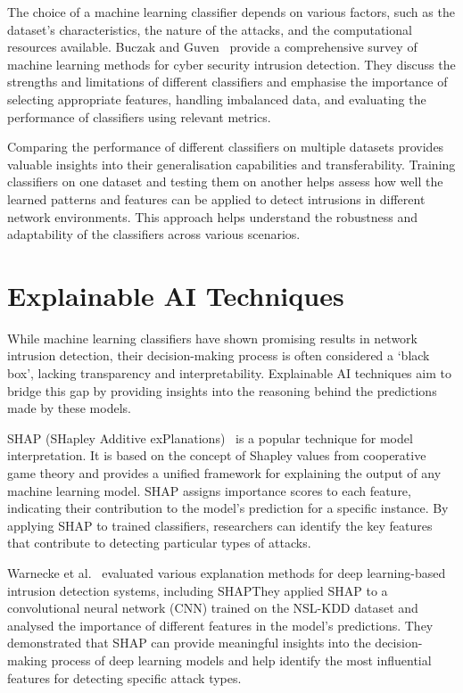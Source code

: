 The choice of a machine learning classifier depends on various factors, such as the dataset's characteristics, the nature of the attacks, and the computational resources available. Buczak and Guven~\cite{buczak2015survey} provide a comprehensive survey of machine learning methods for cyber security intrusion detection. They discuss the strengths and limitations of different classifiers and emphasise the importance of selecting appropriate features, handling imbalanced data, and evaluating the performance of classifiers using relevant metrics.

Comparing the performance of different classifiers on multiple datasets provides valuable insights into their generalisation capabilities and transferability. Training classifiers on one dataset and testing them on another helps assess how well the learned patterns and features can be applied to detect intrusions in different network environments. This approach helps understand the robustness and adaptability of the classifiers across various scenarios.

\section{Explainable AI Techniques}\label{sec:explainable}

While machine learning classifiers have shown promising results in network intrusion detection, their decision-making process is often considered a `black box', lacking transparency and interpretability. Explainable AI techniques aim to bridge this gap by providing insights into the reasoning behind the predictions made by these models.

SHAP (SHapley Additive exPlanations)~\cite{lundberg2017unified} is a popular technique for model interpretation. It is based on the concept of Shapley values from cooperative game theory and provides a unified framework for explaining the output of any machine learning model. SHAP assigns importance scores to each feature, indicating their contribution to the model's prediction for a specific instance. By applying SHAP to trained classifiers, researchers can identify the key features that contribute to detecting particular types of attacks.

Warnecke et al.~\cite{warnecke2020evaluating} evaluated various explanation methods for deep learning-based intrusion detection systems, including SHAP\@ They applied SHAP to a convolutional neural network (CNN) trained on the NSL-KDD dataset and analysed the importance of different features in the model's predictions. They demonstrated that SHAP can provide meaningful insights into the decision-making process of deep learning models and help identify the most influential features for detecting specific attack types.

